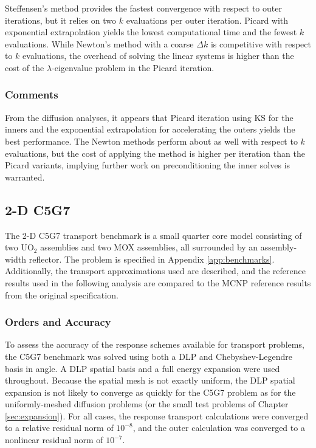 Steffensen's method provides the fastest convergence with respect to 
outer iterations, but it relies on two $k$ evaluations per outer iteration.
Picard with exponential extrapolation yields the lowest computational 
time and the fewest $k$ evaluations.  While Newton's method with a 
coarse $\Delta k$ is competitive with respect to $k$ evaluations, the 
overhead of solving the linear systems is higher than the cost of the 
$\lambda$-eigenvalue problem in the Picard iteration.


\subsubsection{Comments}

From the diffusion analyses, it appears that Picard iteration using 
KS for the inners and the exponential extrapolation for accelerating 
the outers yields the best performance.  The Newton methods perform 
about as well with respect to $k$ evaluations, but the cost of 
applying the method is higher per iteration than the Picard variants,
implying further work on preconditioning the inner solves is warranted.

\subsection{2-D C5G7}


The 2-D C5G7 transport benchmark is a small quarter core 
model consisting of two UO$_2$ assemblies and two MOX
assemblies, all surrounded by an assembly-width reflector.
The problem is specified in Appendix \ref{app:benchmarks}.  Additionally,
the transport approximations used are described, and 
the \Detran reference results used in the following analysis are compared 
to the MCNP reference results from the original specification.  
 
\subsubsection{Orders and Accuracy}
 
To assess the accuracy of the response schemes available for transport 
problems, the C5G7 benchmark was solved using both a DLP and 
Chebyshev-Legendre basis in angle. A DLP spatial basis and a full 
energy expansion were used throughout.  Because the 
spatial mesh is not exactly uniform, the DLP spatial expansion is not 
likely to converge as quickly for the C5G7 problem as for the 
uniformly-meshed diffusion problems (or the small test problems
of Chapter \ref{sec:expansion}).  For all cases, 
the response transport calculations were converged to 
a relative residual norm of $10^{-8}$, and the outer calculation was 
converged to a nonlinear residual norm of $10^{-7}$.

